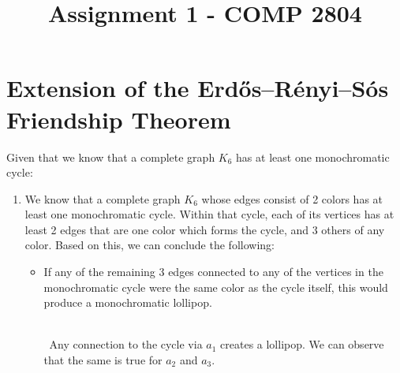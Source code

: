 \documentclass{article}
\begin{document}

\title{Assignment 1 - COMP 2804}
\maketitle
\thispagestyle{fancy}
\noindent
{}

\medskip

\section{Extension of the Erdős–Rényi–Sós Friendship Theorem}

Given that we know that a complete graph $K_6$ has at least one monochromatic cycle:

\begin{enumerate}
    \item We know that a complete graph $K_6$ whose edges consist of 2 colors has at least one monochromatic cycle. Within that cycle, each of its vertices has at least 2 edges that are one color which forms the cycle, and 3 others of any color. Based on this, we can conclude the following: 
\begin{itemize}
    \item If any of the remaining 3 edges connected to any of the vertices in the monochromatic cycle were the same color as the cycle itself, this would produce a monochromatic lollipop. 

    \begin{center}
        \\ \vspace{5mm}\
        Any connection to the cycle via $a_1$ creates a lollipop. We can observe that the same is true for $a_2$ and $a_3$.
    \end{center}
    

\end{itemize}
\end{enumerate}
\end{document}
